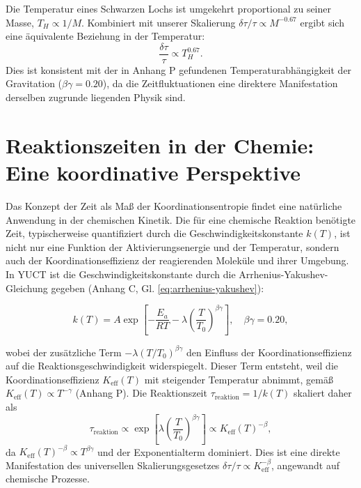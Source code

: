 \documentclass[12pt,a4paper]{article}
\newcommand{\Keff}{K_{\mathrm{eff}}}
\begin{document}
	Die Temperatur eines Schwarzen Lochs ist umgekehrt proportional zu seiner Masse, \(T_H \propto 1/M\). Kombiniert mit unserer Skalierung \(\delta\tau/\tau \propto M^{-0.67}\) ergibt sich eine äquivalente Beziehung in der Temperatur:
	\begin{equation}
		\frac{\delta\tau}{\tau} \propto T_H^{0.67}.
	\end{equation}
	Dies ist konsistent mit der in Anhang P gefundenen Temperaturabhängigkeit der Gravitation (\(\beta\gamma = 0.20\)), da die Zeitfluktuationen eine direktere Manifestation derselben zugrunde liegenden Physik sind.
	
	\section{Reaktionszeiten in der Chemie: Eine koordinative Perspektive}
	\label{sec:chemistry}
	
	Das Konzept der Zeit als Maß der Koordinationsentropie findet eine natürliche Anwendung in der chemischen Kinetik. Die für eine chemische Reaktion benötigte Zeit, typischerweise quantifiziert durch die Geschwindigkeitskonstante \(k(T)\), ist nicht nur eine Funktion der Aktivierungsenergie und der Temperatur, sondern auch der Koordinationseffizienz der reagierenden Moleküle und ihrer Umgebung. In YUCT ist die Geschwindigkeitskonstante durch die Arrhenius-Yakushev-Gleichung gegeben (Anhang C, Gl. \ref{eq:arrhenius-yakushev}):
	
	\begin{equation}
		k(T) = A \exp\left[-\frac{E_a}{RT} - \lambda \left(\frac{T}{T_0}\right)^{\beta\gamma}\right], \quad \beta\gamma = 0.20,
	\end{equation}
	
	wobei der zusätzliche Term \(-\lambda (T/T_0)^{\beta\gamma}\) den Einfluss der Koordinationseffizienz auf die Reaktionsgeschwindigkeit widerspiegelt. Dieser Term entsteht, weil die Koordinationseffizienz \(\Keff(T)\) mit steigender Temperatur abnimmt, gemäß \(\Keff(T) \propto T^{-\gamma}\) (Anhang P). Die Reaktionszeit \(\tau_{\mathrm{reaktion}} = 1/k(T)\) skaliert daher als
	\begin{equation}
		\tau_{\mathrm{reaktion}} \propto \exp\left[\lambda \left(\frac{T}{T_0}\right)^{\beta\gamma}\right] \propto \Keff(T)^{-\beta},
	\end{equation}
	da \(\Keff(T)^{-\beta} \propto T^{\beta\gamma}\) und der Exponentialterm dominiert. Dies ist eine direkte Manifestation des universellen Skalierungsgesetzes \(\delta \tau / \tau \propto \Keff^{-\beta}\), angewandt auf chemische Prozesse.
	
\end{document}
